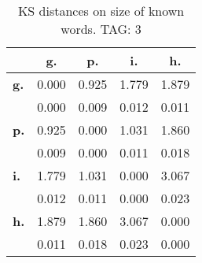 \begin{table}[h!]
\begin{center}
\begin{tabular}{| l || c | c | c | c |}\hline
 & {\bf g.} & {\bf p.} & {\bf i.} & {\bf h.} \\\hline\hline
{\bf g.} & 0.000 & 0.925 & 1.779 & 1.879 \\
{\bf } & 0.000 & 0.009 & 0.012 & 0.011 \\\hline
{\bf p.} & 0.925 & 0.000 & 1.031 & 1.860 \\
{\bf } & 0.009 & 0.000 & 0.011 & 0.018 \\\hline
{\bf i.} & 1.779 & 1.031 & 0.000 & 3.067 \\
{\bf } & 0.012 & 0.011 & 0.000 & 0.023 \\\hline
{\bf h.} & 1.879 & 1.860 & 3.067 & 0.000 \\
{\bf } & 0.011 & 0.018 & 0.023 & 0.000 \\\hline
\end{tabular}
\caption{KS distances on size of known words. TAG: 3}
\end{center}
\end{table}